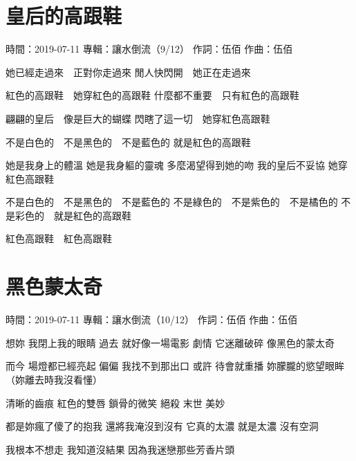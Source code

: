 \documentclass[UTF8,a4paper,oneside,twocolumn,12pt]{ctexbook}
\newcommand{\infopair}[2]{\textbullet #1：#2}
\newcommand{\zc}[1][伍佰]{\infopair{作詞}{#1}}
\newcommand{\zq}[1][伍佰]{\infopair{作曲}{#1}}
\newcommand{\zj}[1]{\infopair{專輯}{#1}}
\newcommand{\sj}[1]{\infopair{時間}{#1}}
\newenvironment{info}{\begin{flushleft}\kaishu
	}
	{\end{flushleft}\normalsize\yahei\par}
\newenvironment{lyric}{
	}
{}
\begin{document}
\section{皇后的高跟鞋}
\begin{info}
	\sj{2019-07-11}
	\zj{讓水倒流（9/12）}
	\zc
	\zq
\end{info}
\begin{lyric}
	她已經走過來　正對你走過來
	閒人快閃開　她正在走過來

	紅色的高跟鞋　她穿紅色的高跟鞋
	什麼都不重要　只有紅色的高跟鞋

	翩翩的皇后　像是巨大的蝴蝶
	閃瞎了這一切　她穿紅色高跟鞋

	不是白色的　不是黑色的　不是藍色的
	就是紅色的高跟鞋

	她是我身上的體溫
	她是我身軀的靈魂
	多麼渴望得到她的吻
	我的皇后不妥協
	她穿紅色高跟鞋

	不是白色的　不是黑色的　不是藍色的
	不是綠色的　不是紫色的　不是橘色的
	不是彩色的　就是紅色的高跟鞋

	紅色高跟鞋　紅色高跟鞋
\end{lyric}

\section{黑色蒙太奇}
\begin{info}
	\sj{2019-07-11}
	\zj{讓水倒流（10/12）}
	\zc
	\zq
\end{info}
\begin{lyric}
	想妳 我閉上我的眼睛
	過去 就好像一場電影
	劇情 它迷離破碎
	像黑色的蒙太奇

	而今 場燈都已經亮起
	偏偏 我找不到那出口
	或許 待會就重播
	妳朦朧的慾望眼眸
	（妳離去時我沒看懂）

	清晰的齒痕 紅色的雙唇 鎖骨的微笑
	絕殺 末世 美妙

	都是妳瘋了傻了的抱我
	還將我淹沒到沒有
	它真的太濃 就是太濃
	沒有空洞

	我根本不想走
	我知道沒結果
	因為我迷戀那些芳香片頭
\end{lyric}
\end{document}
